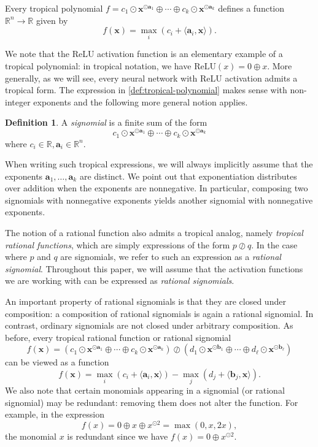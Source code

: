 \documentclass[10pt]{article}
\theoremstyle{definition}
\newtheorem{definition}[theorem]{Definition}
\theoremstyle{remark}
\newcommand{\R}{\mathbb{R}}
\newcommand{\RR}{{\mathbb{R}}}
\renewcommand{\vec}[1]{\mathbf{#1}}
\def\va{{\vec{a}}}
\def\vb{{\vec{b}}}
\def\vx{{\vec{x}}}
\begin{document}
Every tropical polynomial $f = c_1 \odot \vx^{\odot \va_1} \oplus \dotsb \oplus c_k \odot \vx^{\odot \va_k}$ defines a function $\RR^n \to \R$ given by
$$
f(\vx) = \max_i \left(c_i + \langle \va_i, \vx \rangle\right).
$$

We note that the ReLU activation function is an elementary example of a tropical polynomial: in tropical notation, we have $\mathrm{ReLU}(x) = 0 \oplus x$. More generally, as we will see, every neural network with ReLU activation admits a tropical form. The expression in \cref{def:tropical-polynomial} makes sense with non-integer exponents and the following more general notion applies.

\begin{definition} \label{def:sig}
    A \emph{signomial} is a finite sum of the form
    $$
        c_1 \odot \vx^{\odot \va_1} \oplus \dotsb \oplus c_k \odot \vx^{\odot \va_k}
    $$
    where $c_i \in \mathbb{R}, \va_i \in \RR^n.$
\end{definition}
When writing such tropical expressions, we will always implicitly assume that the exponents $\va_1, \dotsc, \va_k$ are distinct. We point out that exponentiation distributes over addition when the exponents are nonnegative. In particular, composing two signomials with nonnegative exponents yields another signomial with nonnegative exponents.

The notion of a rational function also admits a tropical analog, namely \emph{tropical rational functions}, which are simply expressions of the form $p \oslash q$. In the case where $p$ and $q$ are signomials, we refer to such an expression as a \emph{rational signomial}. Throughout this paper, we will assume that the activation functions we are working with can be expressed as \emph{rational signomials}.

An important property of rational signomials is that they are closed under composition: a composition of rational signomials is again a rational signomial. In contrast, ordinary signomials are not closed under arbitrary composition. As before, every tropical rational function or rational signomial
$$
    f(\vx) = \left(c_1 \odot \vx^{\odot \va_1} \oplus \dotsb \oplus c_k \odot \vx^{\odot \va_k} \right) \oslash \left( d_1 \odot \vx^{\odot \vb_1} \oplus \dotsb \oplus d_\ell \odot \vx^{\odot \vb_\ell} \right)
$$
can be viewed as a function
$$
    f(\vx) = \max_i \left(c_i + \langle \va_i, \vx \rangle\right) - \max_j \left(d_j + \langle \vb_j, \vx \rangle\right).
$$
We also note that certain monomials appearing in a signomial (or rational signomial) may be redundant: removing them does not alter the function. For example, in the expression 
$$
f(x) = 0 \oplus x \oplus x^{\odot 2} = \max(0, x, 2x),
$$ 
the monomial $x$ is redundant since we have $f(x) = 0 \oplus x^{\odot 2}.$
\end{document}
